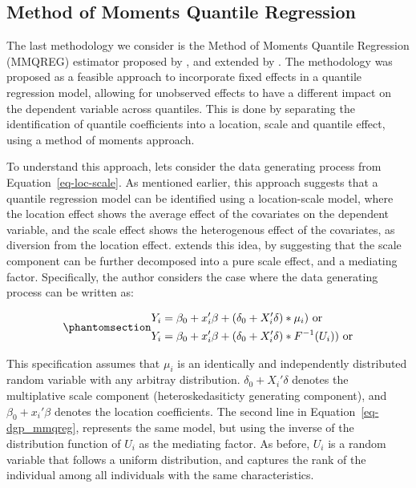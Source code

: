 \documentclass[bib]{statapress}
\begin{document}
\subsection{\texorpdfstring{Method of Moments Quantile Regression
\citet{mss2019}}{Method of Moments Quantile Regression @mss2019}}\label{sec-mmqr}

The last methodology we consider is the Method of Moments Quantile
Regression (MMQREG) estimator proposed by \citet{mss2019}, and extended
by \citet{riosavila2024}. The methodology was proposed as a feasible
approach to incorporate fixed effects in a quantile regression model,
allowing for unobserved effects to have a different impact on the
dependent variable across quantiles. This is done by separating the
identification of quantile coefficients into a location, scale and
quantile effect, using a method of moments approach.

To understand this approach, lets consider the data generating process
from Equation~\ref{eq-loc-scale}. As mentioned earlier, this approach
suggests that a quantile regression model can be identified using a
location-scale model, where the location effect shows the average effect
of the covariates on the dependent variable, and the scale effect shows
the heterogenous effect of the covariates, as diversion from the
location effect. \citet{mss2019} extends this idea, by suggesting that
the scale component can be further decomposed into a pure scale effect,
and a mediating factor. Specifically, the author considers the case
where the data generating process can be written as:

\begin{equation}\phantomsection\label{eq-dgp_mmqreg}{\begin{aligned}
Y_{i} &= \beta_0 + x_{i}' \beta + (\delta_0 + X_{i}' \delta)*\mu_i) \text{ or} \\
Y_{i} &= \beta_0 + x_{i}' \beta + (\delta_0 + X_{i}' \delta)*F^{-1}(U_i)) \text{ or} 
\end{aligned}
}\end{equation}

This specification assumes that \(\mu_i\) is an identically and
independently distributed random variable with any arbitray
distribution. \(\delta_0 + X_{i}' \delta\) denotes the multiplative
scale component (heteroskedasiticty generating component), and
\(\beta_0 + x_{i}' \beta\) denotes the location coefficients. The second
line in Equation~\ref{eq-dgp_mmqreg}, represents the same model, but
using the inverse of the distribution function of \(U_i\) as the
mediating factor. As before, \(U_i\) is a random variable that follows a
uniform distribution, and captures the rank of the individual among all
individuals with the same characteristics.
\end{document}
